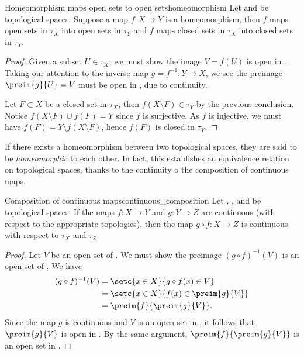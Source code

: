 \begin{proposition}{Homeomorphism maps open sets to open sets}{homeomorphism}
    Let  and  be topological spaces. Suppose a map \(f : X \to Y\) is a homeomorphism, then \(f\) maps open sets in \(\tau_X\) into open sets in \(\tau_Y\) and \(f\) maps closed sets in \(\tau_X\) into closed sets in \(\tau_Y\).
\end{proposition}
\begin{proof}
    Given a subset \(U \in \tau_X\), we must show the image \(V = f(U)\) is open in . Taking our attention to the inverse map \(g = f^{-1} : Y \to X\), we see the preimage \(\preim{g}{U} = V\) must be open in , due to continuity.

    Let \(F\subset X\) be a closed set in \(\tau_X\), then \(f(X \setminus F) \in \tau_Y\) by the previous conclusion. Notice \(f(X \setminus F) \cup f(F) = Y\) since \(f\) is surjective. As \(f\) is injective, we must have \(f(F) = Y \setminus f(X\setminus F)\), hence \(f(F)\) is closed in \(\tau_Y\).
\end{proof}

If there exists a homeomorphism between two topological spaces, they are said to be \emph{homeomorphic} to each other. In fact, this establishes an equivalence relation on topological spaces, thanks to the continuity o the composition of continuous maps.
\begin{theorem}{Composition of continuous maps}{continuous_composition}
Let , , and  be topological spaces. If the maps \(f: X \to Y\) and \(g : Y \to Z\) are continuous (with respect to the appropriate topologies), then the map \(g \circ f : X \to Z\) is continuous with respect to \(\tau_X\) and \(\tau_Z\).
\end{theorem}
\begin{proof}
    Let \(V\) be an open set of . We must show the preimage \((g \circ f)^{-1}(V)\) is an open set of . We have
    \begin{align*}
        (g\circ f)^{-1}(V) &= \setc{x \in X }{g\circ f(x) \in V}\\
                           &= \setc{x \in X }{f(x) \in \preim{g}{V}}\\
                           &= \preim{f}{\preim{g}{V}}.
    \end{align*}
    Since the map \(g\) is continuous and \(V\) is an open set in , it follows that \(\preim{g}{V}\) is open in . By the same argument, \(\preim{f}{\preim{g}{V}}\) is an open set in .
\end{proof}


